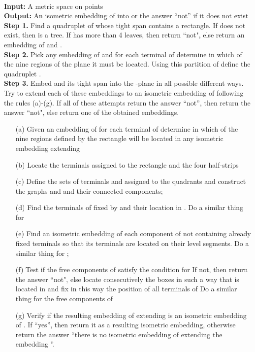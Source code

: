 \documentclass[11pt]{amsart}
\begin{document}
\medskip
{\footnotesize
{}\\
{\bf Input:} A metric space  on  points\\
{\bf Output:} An isometric embedding  of  into 
or the answer ``not'' if it does not exist\\
{\bf Step 1.}  Find a quadruplet  of  whose tight span contains
a rectangle. If  does not exist, then  is a tree. If 
 has more than 4 leaves, then return ``not", else return an embedding of  and .\\
{\bf Step 2.}  Pick any embedding of  and for each terminal of 
determine in which of the nine regions of the plane it must be located.
  Using this partition of  define the quadruplet .\\
{\bf Step 3.}  Embed  and its tight span  into the -plane in all
possible different ways.  Try to extend each of these embeddings
  to an isometric embedding of  following the rules (a)-(g).
  If all of these attempts return the answer ``not'', then return the answer ``not", else return one of the obtained  embeddings.
\begin{itemize}
\item[(a)]  Given an embedding  of  for each terminal  of  determine in which of the nine regions defined by the rectangle  will be located  in any isometric embedding extending  
\item[(b)]  Locate the terminals assigned to the rectangle  and the four half-strips  
\item[(c)]  Define the sets of terminals  and  assigned to the quadrants  and  construct the graphs  and  and their connected components;
\item[(d)]  Find the terminals of  fixed by  and their location in . Do a similar thing for 
\item[(e)]  Find an isometric embedding of each component  of  not containing already fixed terminals so that its terminals are located on their level segments. Do a similar thing for ;
\item[(f)]  Test if the free components  of  satisfy the condition   for  If not, then return the answer ``not", else locate consecutively the boxes  in such a way that   is located in  and fix in this way the position of all terminals of  Do a similar thing for the free components of 
\item[(g)]  Verify if the resulting embedding of  extending  is an isometric embedding of . If ``yes'', then return it as a resulting isometric embedding, otherwise return the answer ``there is no isometric embedding of  extending the embedding ''.
\end{itemize}
}
\end{document}
